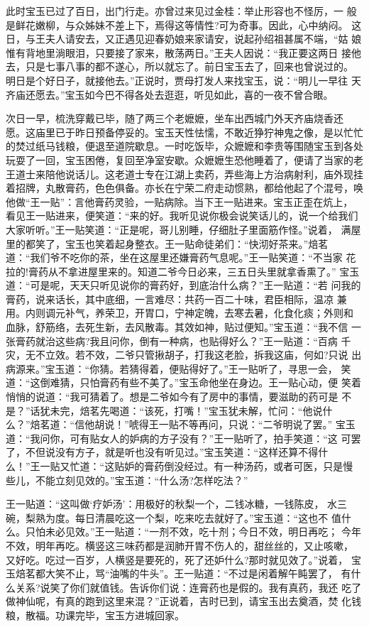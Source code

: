 此时宝玉已过了百日，出门行走。亦曾过来见过金桂：举止形容也不怪厉，一
般是鲜花嫩柳，与众姊妹不差上下，焉得这等情性?可为奇事。因此，心中纳闷。
这日，与王夫人请安去，又正遇见迎春奶娘来家请安，说起孙绍祖甚属不端，“姑
娘惟有背地里淌眼泪，只要接了家来，散荡两日。”王夫人因说：“我正要这两日
接他去，只是七事八事的都不遂心，所以就忘了。前日宝玉去了，回来也曾说过的。
明日是个好日子，就接他去。”正说时，贾母打发人来找宝玉，说：“明儿一早往
天齐庙还愿去。”宝玉如今巴不得各处去逛逛，听见如此，喜的一夜不曾合眼。

次日一早，梳洗穿戴已毕，随了两三个老嬷嬷，坐车出西城门外天齐庙烧香还
愿。这庙里已于昨日预备停妥的。宝玉天性怯懦，不敢近狰狞神鬼之像，是以忙忙
的焚过纸马钱粮，便退至道院歇息。一时吃饭毕，众嬷嬷和李贵等围随宝玉到各处
玩耍了一回，宝玉困倦，复回至净室安歇。众嬷嬷生恐他睡着了，便请了当家的老
王道士来陪他说话儿。这老道士专在江湖上卖药，弄些海上方治病射利，庙外现挂
着招牌，丸散膏药，色色俱备。亦长在宁荣二府走动惯熟，都给他起了个混号，唤
他做“王一贴”：言他膏药灵验，一贴病除。当下王一贴进来。宝玉正歪在炕上，
看见王一贴进来，便笑道：“来的好。我听见说你极会说笑话儿的，说一个给我们
大家听听。”王一贴笑道：“正是呢，哥儿别睡，仔细肚子里面筋作怪。”说着，
满屋里的都笑了，宝玉也笑着起身整衣。王一贴命徒弟们：“快沏好茶来。”焙茗
道：“我们爷不吃你的茶，坐在这屋里还嫌膏药气息呢。”王一贴笑道：“不当家
花拉的!膏药从不拿进屋里来的。知道二爷今日必来，三五日头里就拿香熏了。”
宝玉道：“可是呢，天天只听见说你的膏药好，到底治什么病？”王一贴道：“若
问我的膏药，说来话长，其中底细，一言难尽：共药一百二十味，君臣相际，温凉
兼用。内则调元补气，养荣卫，开胃口，宁神定魄，去寒去暑，化食化痰；外则和
血脉，舒筋络，去死生新，去风散毒。其效如神，贴过便知。”宝玉道：“我不信
一张膏药就治这些病?我且问你，倒有一种病，也贴得好么？”王一贴道：“百病
千灾，无不立效。若不效，二爷只管揪胡子，打我这老脸，拆我这庙，何如?只说
出病源来。”宝玉道：“你猜。若猜得着，便贴得好了。”王一贴听了，寻思一会，
笑道：“这倒难猜，只怕膏药有些不美了。”宝玉命他坐在身边。王一贴心动，便
笑着悄悄的说道：“我可猜着了。想是二爷如今有了房中的事情，要滋助的药可是
不是？”话犹未完，焙茗先喝道：“该死，打嘴！”宝玉犹未解，忙问：“他说什
么？”焙茗道：“信他胡说！”唬得王一贴不等再问，只说：“二爷明说了罢。”
宝玉道：“我问你，可有贴女人的妒病的方子没有？”王一贴听了，拍手笑道：“这
可罢了，不但说没有方子，就是听也没有听见过。”宝玉笑道：“这样还算不得什
么！”王一贴又忙道：“这贴妒的膏药倒没经过。有一种汤药，或者可医，只是慢
些儿，不能立刻见效的。”宝玉道：“什么汤?怎样吃法？”

王一贴道：“这叫做‘疗妒汤’：用极好的秋梨一个，二钱冰糖，一钱陈皮，
水三碗，梨熟为度。每日清晨吃这一个梨，吃来吃去就好了。”宝玉道：“这也不
值什么。只怕未必见效。”王一贴道：“一剂不效，吃十剂；今日不效，明日再吃；
今年不效，明年再吃。横竖这三味药都是润肺开胃不伤人的，甜丝丝的，又止咳嗽，
又好吃。吃过一百岁，人横竖是要死的，死了还妒什么?那时就见效了。”说着，
宝玉焙茗都大笑不止，骂“油嘴的牛头”。王一贴道：“不过是闲着解午盹罢了，
有什么关系?说笑了你们就值钱。告诉你们说：连膏药也是假的。我有真药，我还
吃了做神仙呢，有真的跑到这里来混？”正说着，吉时已到，请宝玉出去奠酒，焚
化钱粮，散福。功课完毕，宝玉方进城回家。

